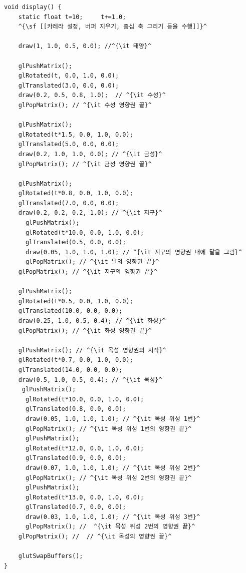 \begin{algorithmbis}\label{code:OGL_transform:solarSystem1}
\lstset{language=C++, escapechar=^} 
\begin{lstlisting}
void display() {
    static float t=10;     t+=1.0;
    ^{\sf [[카레라 설정, 버퍼 지우기, 중심 축 그리기 등을 수행]]}^
    
    draw(1, 1.0, 0.5, 0.0); //^{\it 태양}^
    
    glPushMatrix();
    glRotated(t, 0.0, 1.0, 0.0);
    glTranslated(3.0, 0.0, 0.0);
    draw(0.2, 0.5, 0.8, 1.0);  // ^{\it 수성}^
    glPopMatrix(); // ^{\it 수성 영향권 끝}^
    
    glPushMatrix();
    glRotated(t*1.5, 0.0, 1.0, 0.0);
    glTranslated(5.0, 0.0, 0.0);
    draw(0.2, 1.0, 1.0, 0.0); // ^{\it 금성}^
    glPopMatrix(); // ^{\it 금성 영향권 끝}^
    
    glPushMatrix();
    glRotated(t*0.8, 0.0, 1.0, 0.0);
    glTranslated(7.0, 0.0, 0.0);
    draw(0.2, 0.2, 0.2, 1.0); // ^{\it 지구}^
      glPushMatrix();
      glRotated(t*10.0, 0.0, 1.0, 0.0);
      glTranslated(0.5, 0.0, 0.0);
      draw(0.05, 1.0, 1.0, 1.0); // ^{\it 지구의 영향권 내에 달을 그림}^
      glPopMatrix(); // ^{\it 달의 영향권 끝}^
    glPopMatrix(); // ^{\it 지구의 영향권 끝}^

    glPushMatrix();
    glRotated(t*0.5, 0.0, 1.0, 0.0);
    glTranslated(10.0, 0.0, 0.0);
    draw(0.25, 1.0, 0.5, 0.4); // ^{\it 화성}^
    glPopMatrix(); // ^{\it 화성 영향권 끝}^

    glPushMatrix(); // ^{\it 목성 영향권의 시작}^
    glRotated(t*0.7, 0.0, 1.0, 0.0);
    glTranslated(14.0, 0.0, 0.0);
    draw(0.5, 1.0, 0.5, 0.4); // ^{\it 목성}^
     glPushMatrix();
      glRotated(t*10.0, 0.0, 1.0, 0.0);
      glTranslated(0.8, 0.0, 0.0);  
      draw(0.05, 1.0, 1.0, 1.0); // ^{\it 목성 위성 1번}^
      glPopMatrix(); // ^{\it 목성 위성 1번의 영향권 끝}^
      glPushMatrix();
      glRotated(t*12.0, 0.0, 1.0, 0.0);
      glTranslated(0.9, 0.0, 0.0);
      draw(0.07, 1.0, 1.0, 1.0); // ^{\it 목성 위성 2번}^
      glPopMatrix(); // ^{\it 목성 위성 2번의 영향권 끝}^
      glPushMatrix();
      glRotated(t*13.0, 0.0, 1.0, 0.0);
      glTranslated(0.7, 0.0, 0.0);
      draw(0.03, 1.0, 1.0, 1.0); // ^{\it 목성 위성 3번}^
      glPopMatrix(); //  ^{\it 목성 위성 2번의 영향권 끝}^
    glPopMatrix(); //  // ^{\it 목성의 영향권 끝}^
    
    glutSwapBuffers();
}

\end{lstlisting}
\end{algorithmbis}

